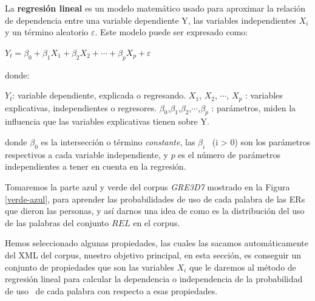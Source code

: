 La \textbf{regresi\'on lineal} es un modelo matem\'atico usado para aproximar la relaci\'on de dependencia entre una variable dependiente Y, las variables independientes $X_i$ y un t\'ermino aleatorio $\varepsilon$. Este modelo puede ser expresado como:

    $Y_t = \beta_0 + \beta_1 X_1 + \beta_2 X_2 + \cdots +\beta_p X_p + \varepsilon$

donde:

    $Y_t$: variable dependiente, explicada o regresando.
    $X_1$, $X_2$, $\cdots$, $X_p$ : variables explicativas, independientes o regresores.
    $\beta_0$,$\beta_1$,$\beta_2$,$\cdots$,$\beta_p$ : par\'ametros, miden la influencia que las variables explicativas tienen sobre Y.

donde $\beta_0$ es la intersecci\'on o t\'ermino {\it constante}, las $\beta_i$ \ (i > 0) son los par\'ametros respectivos a cada variable independiente, y $p$ es el n\'umero de par\'ametros independientes a tener en cuenta en la regresi\'on.

Tomaremos la parte azul y verde del corpus \textit{GRE3D7} mostrado en la Figura \ref{verde-azul}, para aprender las probabilidades de uso de cada palabra de las ERs que dieron las personas, y as\'i darnos una idea de como es la distribuci\'on del uso de las palabras del conjunto $REL$ en el corpus.

Hemos seleccionado algunas propiedades, las cuales las sacamos autom\'aticamente del XML del corpus, nuestro objetivo principal, en esta secci\'on, es conseguir un conjunto de propiedades que son las variables $X_i$ que le daremos al m\'etodo de regresi\'on lineal para calcular la dependencia o independencia de la probabilidad de uso \puse\ de cada palabra con respecto a esas propiedades.

